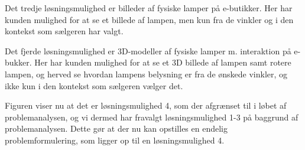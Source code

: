 Det tredje løsningsmulighed er billeder af fysiske lamper på e-butikker. Her har kunden mulighed for at se et billede af lampen, men kun fra de vinkler og i den kontekst som sælgeren har valgt.

Det fjerde løsningsmulighed er 3D-modeller af fysiske lamper m. interaktion på e-bukker. Her har kunden mulighed for at se et 3D billede af lampen samt rotere lampen, og herved se hvordan lampens belysning er fra de ønskede vinkler, og ikke kun i den kontekst som sælgeren vælger det. 

Figuren viser nu at det er løsningsmulighed 4, som der afgrænset til i løbet af problemanalysen, og vi dermed har fravalgt løsningsmulighed 1-3 på baggrund af problemanalysen. Dette gør at der nu kan opstilles en endelig problemformulering, som ligger op til en løsningsmulighed 4.